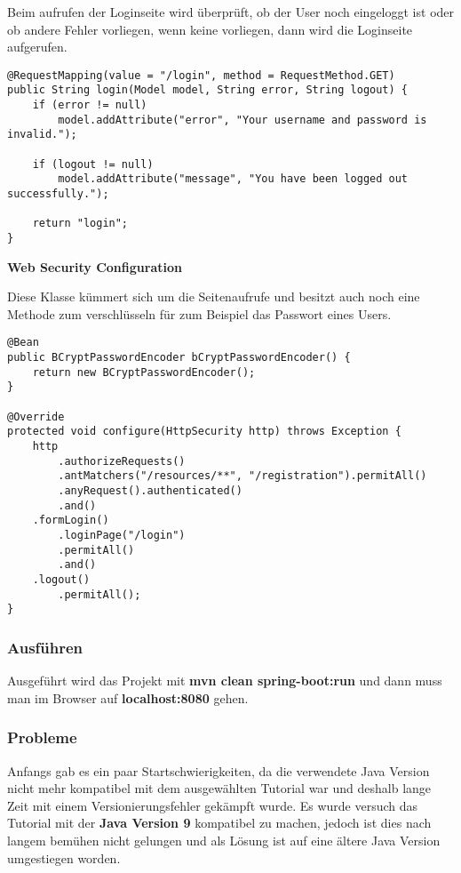 Beim aufrufen der Loginseite wird überprüft, ob der User noch eingeloggt ist oder ob andere Fehler vorliegen, wenn keine vorliegen, dann wird die Loginseite aufgerufen.

\begin{lstlisting}[style=Java]
@RequestMapping(value = "/login", method = RequestMethod.GET)
public String login(Model model, String error, String logout) {
	if (error != null)
		model.addAttribute("error", "Your username and password is invalid.");

	if (logout != null)
		model.addAttribute("message", "You have been logged out successfully.");
		
	return "login";
}
\end{lstlisting}

\item \textbf{Web Security Configuration}

Diese Klasse kümmert sich um die Seitenaufrufe und besitzt auch noch eine Methode zum verschlüsseln für zum Beispiel das Passwort eines Users.

\begin{lstlisting}[style=Java]
@Bean
public BCryptPasswordEncoder bCryptPasswordEncoder() {
	return new BCryptPasswordEncoder();
}

@Override
protected void configure(HttpSecurity http) throws Exception {
	http
		.authorizeRequests()
		.antMatchers("/resources/**", "/registration").permitAll()
		.anyRequest().authenticated()
		.and()
	.formLogin()
		.loginPage("/login")
		.permitAll()
		.and()
	.logout()
		.permitAll();
}
\end{lstlisting}

\clearpage

\subsubsection{Ausführen}

Ausgeführt wird das Projekt mit \textbf{mvn clean spring-boot:run} und dann muss man im Browser auf \textbf{localhost:8080} gehen.


\subsubsection{Probleme}
Anfangs gab es ein paar \glqq Startschwierigkeiten\grqq , da die verwendete Java Version nicht mehr kompatibel mit dem ausgewählten Tutorial war und deshalb lange Zeit mit einem Versionierungsfehler gekämpft wurde. Es wurde versuch das Tutorial mit der \textbf{Java Version 9} kompatibel zu machen, jedoch ist dies nach langem bemühen nicht gelungen und als Lösung ist auf eine ältere Java Version umgestiegen worden.


\clearpage
